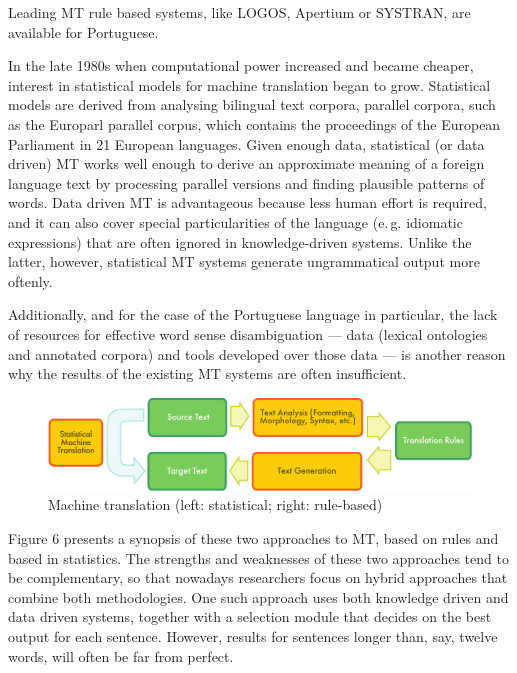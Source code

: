 \begin{multicols}{2}
Leading MT rule based systems, like LOGOS, Apertium or SYSTRAN, are available for Portuguese. 

In the late 1980s when computational power increased and became cheaper, interest in statistical models for machine translation began to grow. Statistical models are derived from analysing bilingual text corpora, parallel corpora, such as the Europarl parallel corpus, which contains the proceedings of the European Parliament in 21 European languages. Given enough data, statistical (or data driven) MT works well enough to derive an approximate meaning of a foreign language text by processing parallel versions and finding plausible patterns of words. Data driven MT is advantageous because less human effort is required, and it can also cover special particularities of the language (e.\,g. idiomatic expressions) that are often ignored in knowledge-driven systems.
Unlike the latter, however, statistical MT systems generate ungrammatical output more oftenly.  

Additionally, and for the case of the Portuguese language in particular, the lack of resources for effective word sense disambiguation 
--- data (lexical ontologies and annotated corpora) and tools developed over those data --- 
is another reason why the results of the existing MT systems are often insufficient. 

\begin{figure}[htb]
  \center
  \includegraphics[width=\textwidth]{../_media/english/machine_translation}
  \caption{Machine translation (left: statistical; right: rule-based)}
  \label{fig:mtarch_en}
\end{figure}

Figure 6 presents a synopsis of these two approaches to MT, based on rules and based in statistics. The strengths and weaknesses of these two approaches tend to be complementary, so that nowadays researchers focus on hybrid approaches that combine both methodologies. One such approach uses both knowledge driven and data driven systems, together with a selection module that decides on the best output for each sentence. However, results for sentences longer than, say, twelve words, will often be far from perfect.


\end{multicols}
